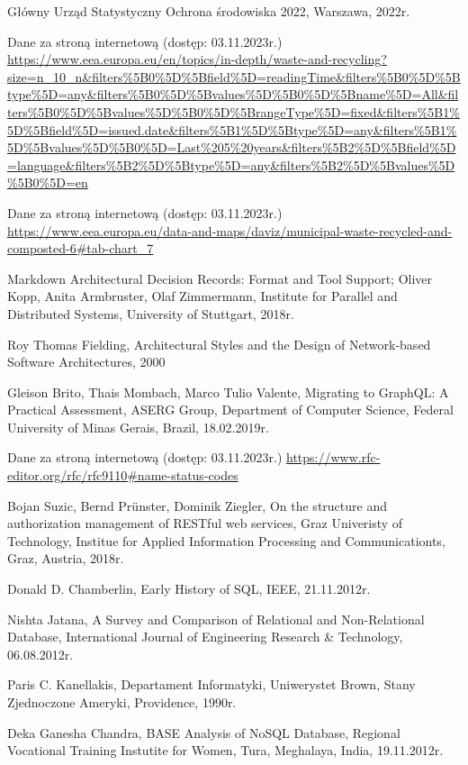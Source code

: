 \documentclass[12pt, a4paper, twoside, openany]{book}
\begin{document}
{\begin{enumerate}[label={[}\arabic*{]}]
    \item Główny Urząd Statystyczny Ochrona środowiska 2022, Warszawa, 2022r.
    \item Dane za stroną internetową (dostęp: 03.11.2023r.) \url{https://www.eea.europa.eu/en/topics/in-depth/waste-and-recycling?size=n_10_n&filters%5B0%5D%5Bfield%5D=readingTime&filters%5B0%5D%5Btype%5D=any&filters%5B0%5D%5Bvalues%5D%5B0%5D%5Bname%5D=All&filters%5B0%5D%5Bvalues%5D%5B0%5D%5BrangeType%5D=fixed&filters%5B1%5D%5Bfield%5D=issued.date&filters%5B1%5D%5Btype%5D=any&filters%5B1%5D%5Bvalues%5D%5B0%5D=Last%205%20years&filters%5B2%5D%5Bfield%5D=language&filters%5B2%5D%5Btype%5D=any&filters%5B2%5D%5Bvalues%5D%5B0%5D=en}
    \item Dane za stroną internetową (dostęp: 03.11.2023r.) \url{https://www.eea.europa.eu/data-and-maps/daviz/municipal-waste-recycled-and-composted-6#tab-chart_7}
    \item Markdown Architectural Decision Records: Format and Tool Support; Oliver Kopp, Anita Armbruster, Olaf Zimmermann, Institute for Parallel and Distributed Systems, University of Stuttgart, 2018r.
    \item Roy Thomas Fielding, Architectural Styles and the Design of Network-based Software Architectures, 2000
    \item Gleison Brito, Thais Mombach, Marco Tulio Valente, Migrating to GraphQL: A Practical Assessment, ASERG Group, Department of Computer Science, Federal University of Minas Gerais, Brazil, 18.02.2019r.
    \item Dane za stroną internetową (dostęp: 03.11.2023r.) \url{https://www.rfc-editor.org/rfc/rfc9110#name-status-codes}
    \item Bojan Suzic, Bernd Prünster, Dominik Ziegler, On the structure and authorization management of RESTful web services, Graz Univeristy of Technology, Institue for Applied Information Processing and Communicationts, Graz, Austria, 2018r.
    \item Donald D. Chamberlin, Early History of SQL, IEEE, 21.11.2012r.
    \item Nishta Jatana, A Survey and Comparison of Relational and Non-Relational Database, International Journal of Engineering Research \& Technology, 06.08.2012r.
    \item Paris C. Kanellakis, Departament Informatyki, Uniwerystet Brown, Stany Zjednoczone Ameryki, Providence, 1990r.
    \item Deka Ganesha Chandra, BASE Analysis of NoSQL Database, Regional Vocational Training Instutite for Women, Tura, Meghalaya, India, 19.11.2012r.

\end{enumerate}}
\end{document}
